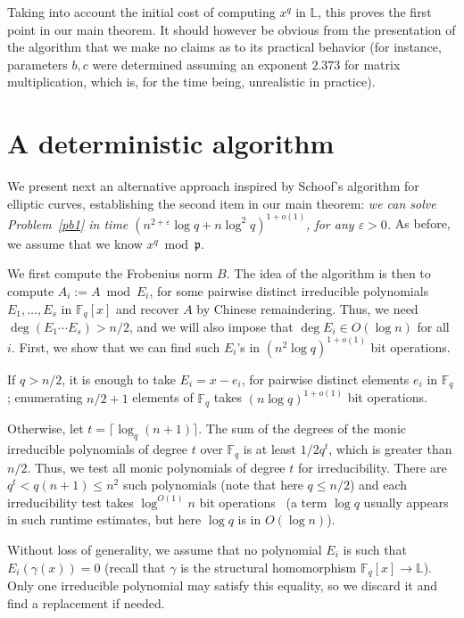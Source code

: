 \documentclass[sigconf]{acmart}
\newcommand{\F}{\mathbb{F}}
\renewcommand{\L}{\mathbb{L}}
\newcommand{\frakp}{\mathfrak{p}}
\begin{document}
Taking into account the initial cost of computing $x^q$ in $\L$, this
proves the first point in our main theorem. It should however be
obvious from the presentation of the algorithm that we make no claims
as to its practical behavior (for instance, parameters $b,c$ were
determined assuming an exponent $2.373$ for matrix multiplication,
which is, for the time being, unrealistic in practice).


\section{A deterministic algorithm}\label{sec:schoof}

We present next an alternative approach inspired by Schoof's algorithm
for elliptic curves, establishing the second item in our main theorem:
{\em we can solve Problem~\ref{pb1} in time $(n^{2+\varepsilon} \log q + n
\log^2 q)^{1+o(1)}$, for any $\varepsilon > 0$.} As before, we assume 
that we know $x^q \bmod \frakp$.

\smallskip{} We first compute the Frobenius norm
$B$. The idea of the algorithm is then to compute $A_i:=A \bmod E_i$,
for some pairwise distinct irreducible polynomials $E_1,\dots,E_s$ in
$\F_q[x]$ and recover $A$ by Chinese remaindering.  Thus, we
need $\deg(E_1 \cdots E_s) > n/2$, and we will also impose that $\deg
E_i \in O(\log n)$ for all $i$. First, we show that we can find such
 $E_i$'s in $(n^2 \log q)^{1+o(1)}$ bit operations.

If $q > n/2$, it is enough to take $E_i = x-e_i$, for pairwise
distinct elements $e_i$ in $\F_q$; enumerating $n/2+1$ elements of
$\F_q$ takes $(n \log q)^{1+o(1)}$ bit operations.

Otherwise, let $t= \lceil \log_q (n+1)\rceil$. The sum of the degrees
of the monic irreducible polynomials of degree $t$ over $\F_q$ is at
least $1/2 q^t$, which is greater than $n/2$. Thus, we test all monic
polynomials of degree $t$ for irreducibility. There are $q^t < q(n+1)
\le n^2$ such polynomials (note that here $q \le n/2$) and each
irreducibility test takes $\log^{O(1)} n$ bit
operations~\cite{vonzurGathen1992} (a term $\log q$ usually appears in
such runtime estimates, but here $\log q$ is in $O(\log n)$).

Without loss of generality, we assume that no polynomial $E_i$ is such
that $E_i(\gamma(x))=0$ (recall that $\gamma$ is the structural
homomorphism $\F_q[x] \to \L$). Only one irreducible polynomial may
satisfy this equality, so we discard it and find a replacement if
needed.
\end{document}
